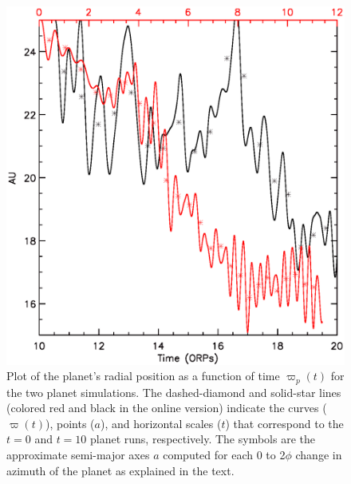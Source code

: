 \documentclass[12pt,manuscript,authoryear]{aastex}
\begin{document}
\begin{figure}[t]
\center
\includegraphics[width=12cm]{Figures/planeta.eps}
\caption{Plot of the planet's radial position as a function of time $\varpi_p(t)$ for the two planet simulations. The
  dashed-diamond and solid-star lines (colored red and black in the online version) indicate the curves ($\varpi(t)$),
  points ($a$), and horizontal scales ($t$) that correspond to the $t = 0$ and $t = 10$ planet runs, respectively. The
  symbols are the approximate semi-major axes $a$ computed for each 0 to 2$\phi$ change in azimuth of the planet as
  explained in the text.}
\label{fig:a}
\end{figure}
\end{document}
